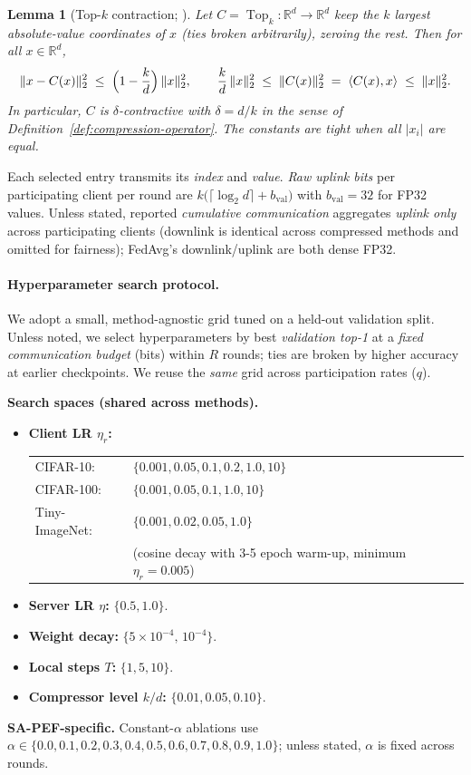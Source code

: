 \documentclass{article} %
\newtheorem{lemma}{Lemma}
\begin{document}
\begin{lemma}[Top-$k$ contraction; \citep{stich2018sparsified,beznosikov2023biased}]
\label{lem:topk}
Let $C=\operatorname{Top}_k:\mathbb{R}^d\!\to\!\mathbb{R}^d$ keep the $k$ largest
absolute-value coordinates of $x$ (ties broken arbitrarily), zeroing the rest.
Then for all $x\in\mathbb{R}^d$,
\[
\|x-C(x)\|_2^2 \;\le\; \Bigl(1-\frac{k}{d}\Bigr)\,\|x\|_2^2,
\qquad
\frac{k}{d}\,\|x\|_2^2 \;\le\; \|C(x)\|_2^2 \;=\; \langle C(x),x\rangle \;\le\; \|x\|_2^2.
\]
In particular, $C$ is $\delta$-contractive with $\delta=d/k$ in the sense of
Definition~\ref{def:compression-operator}. The constants are tight when all $|x_i|$
are equal.
\end{lemma}


Each selected entry transmits its \emph{index} and \emph{value}. \emph{Raw uplink bits} per participating client per round are
$k\big(\lceil\log_2 d\rceil + b_{\text{val}}\big)$ with $b_{\text{val}}{=}32$ for FP32 values. Unless stated, reported \emph{cumulative communication} aggregates \emph{uplink only} across participating clients (downlink is identical across compressed methods and omitted for fairness); FedAvg’s downlink/uplink are both dense FP32.

\paragraph{Hyperparameter search protocol.}
We adopt a small, method-agnostic grid tuned on a held-out validation split. Unless noted, we select hyperparameters by best \emph{validation top-1} at a \emph{fixed communication budget} (bits) within $R$ rounds; ties are broken by higher accuracy at earlier checkpoints.
We reuse the \emph{same} grid across participation rates ($q$).

\textbf{Search spaces (shared across methods).}
\label{search_grid}
\begin{itemize}[leftmargin=8pt]
\item \textbf{Client LR $\eta_r$:}
\begin{tabular}{@{}l l@{}}
CIFAR-10:      & $\{0.001, 0.05, 0.1, 0.2, 1.0, 10\}$ \\
CIFAR-100:     & $\{0.001, 0.05, 0.1, 1.0, 10\}$ \\
Tiny-ImageNet: & $\{0.001, 0.02, 0.05, 1.0\}$ \\
               & (cosine decay with 3-5 epoch warm-up, minimum $\eta_r = 0.005$)
\end{tabular}
\item \textbf{Server LR $\eta$:} $\{0.5,1.0\}$.
\item \textbf{Weight decay:} $\{5\!\times\!10^{-4},\,10^{-4}\}$.
\item \textbf{Local steps $T$:} $\{1,5,10\}$.
\item \textbf{Compressor level $k/d$:} $\{0.01,0.05,0.10\}$.
\end{itemize}
\textbf{SA-PEF-specific.} Constant-$\alpha$ ablations use $\alpha\in\{0.0,0.1, 0.2, 0.3, 0.4, 0.5, 0.6, 0.7, 0.8, 0.9, 1.0\}$; unless stated, $\alpha$ is fixed across rounds.
\end{document}
